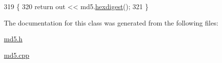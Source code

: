 \begin{DoxyCode}
319 \{
320   \textcolor{keywordflow}{return} out << md5.\hyperlink{classMD5_ad36c65acf87e397bf717bc3defbc0c7a}{hexdigest}();
321 \}
\end{DoxyCode}


The documentation for this class was generated from the following files\-:\begin{DoxyCompactItemize}
\item 
\hyperlink{md5_8h}{md5.\-h}\item 
\hyperlink{md5_8cpp}{md5.\-cpp}\end{DoxyCompactItemize}
